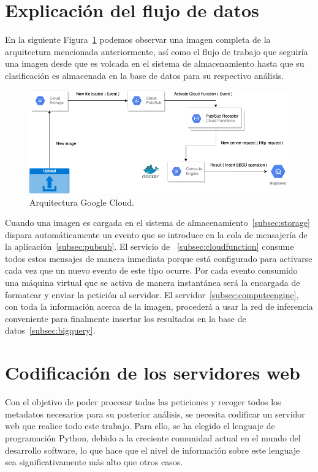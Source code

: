 \section{Explicación del flujo de datos}\label{sec:explicación-del-flujo-de-la-arquitectura}
En la siguiente Figura~\ref{fig:Arquitectura Google Cloud} podemos observar una imagen completa de la arquitectura mencionada anteriormente, así como el flujo de trabajo que seguiría una imagen desde que es volcada en el sistema de almacenamiento hasta que su clasificación es almacenada en la base de datos para su respectivo análisis.
\begin{figure}
    \centering
    \includegraphics[width=1.0\textwidth]{images/chapter4/google_cloud_architecture.png}
    \caption{Arquitectura Google Cloud.}
    \label{fig:Arquitectura Google Cloud}
\end{figure}

Cuando una imagen es cargada en el sistema de almacenamiento~\ref{subsec:storage} dispara automáticamente un evento que se introduce en la cola de mensajería de la aplicación~\ref{subsec:pubsub}.
El servicio de ~\ref{subsec:cloudfunction} consume todos estos mensajes de manera inmediata porque está configurado para activarse cada vez que un nuevo evento de este tipo ocurre.
Por cada evento consumido una máquina virtual que se activa de manera instantánea será la encargada de formatear y enviar la petición al servidor.
El servidor~\ref{subsec:computeengine}, con toda la información acerca de la imagen, procederá a usar la red de inferencia conveniente para finalmente insertar los resultados en la base de datos~\ref{subsec:bigquery}.

\section{Codificación de los servidores web}\label{sec:codificación-de-los-servidores-web}
Con el objetivo de poder procesar todas las peticiones y recoger todos los metadatos necesarios para su posterior análisis, se necesita codificar un servidor web que realice todo este trabajo.
Para ello, se ha elegido el lenguaje de programación Python, debido a la creciente comunidad actual en el mundo del desarrollo software, lo que hace que el nivel de información sobre este lenguaje sea significativamente más alto que otros casos.

